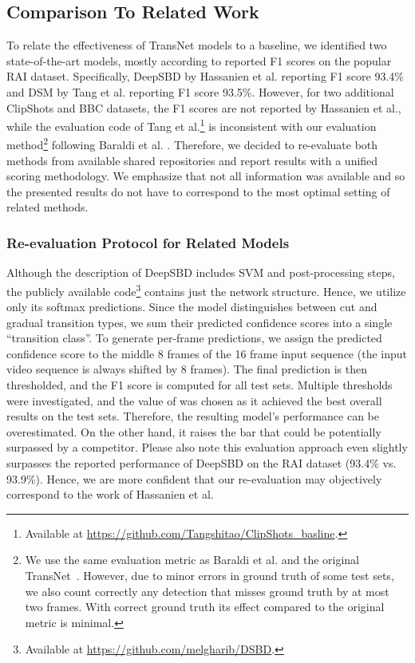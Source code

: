 \documentclass[sigconf]{acmart}
\begin{document}
\subsection{Comparison To Related Work}
To relate the effectiveness of TransNet models to a baseline, we identified two state-of-the-art models, mostly according to reported F1 scores on the popular RAI dataset. Specifically, DeepSBD by Hassanien et al. \cite{HassanienESHM17} reporting F1 score 93.4\% and DSM by Tang et al. \cite{Tang2018clipshots} reporting F1 score 93.5\%. However, for two additional ClipShots and BBC datasets, the F1 scores are not reported by Hassanien et al., while the evaluation code of Tang et al.\footnote{\label{note:1}Available at \url{https://github.com/Tangshitao/ClipShots_basline}.} is inconsistent with our evaluation method\footnote{We use the same evaluation metric as Baraldi et al. \cite{Baraldi15RAI} and the original TransNet~\cite{transnet}. However, due to minor errors in ground truth of some test sets, we also count correctly any detection that misses ground truth by at most two frames. With correct ground truth its effect compared to the original metric is minimal.\label{fn:metric}} following Baraldi et al. \cite{Baraldi15RAI}.
Therefore, we decided to re-evaluate both methods from available shared repositories and report results with a unified scoring methodology. We  emphasize that not all information was available and so the presented results do not have to correspond to the most optimal setting of related methods.

\subsubsection{Re-evaluation Protocol for Related Models}\label{sec:reeval_protocol}
Although the description of DeepSBD includes SVM and post-processing steps, the publicly available code\footnote{Available at \url{https://github.com/melgharib/DSBD}.} contains just the network structure. Hence, we utilize only its softmax predictions.
Since the model distinguishes between cut and gradual transition types, we sum their predicted confidence scores into a single ``transition class''.
To generate per-frame predictions, we assign the predicted confidence score to the middle 8 frames of the 16 frame input sequence (the input video sequence is always shifted by 8 frames). The final prediction is then thresholded, and the F1 score is computed for all test sets. Multiple thresholds were investigated, and the value of  was chosen as it achieved the best overall results on the test sets. Therefore, the resulting model's performance can be overestimated. On the other hand, it raises the bar that could be potentially surpassed by a competitor. Please also note this evaluation approach even slightly surpasses the reported performance of DeepSBD on the RAI dataset (93.4\% vs. 93.9\%). Hence, we are more confident that our re-evaluation may objectively correspond to the work of Hassanien et al.
\end{document}
